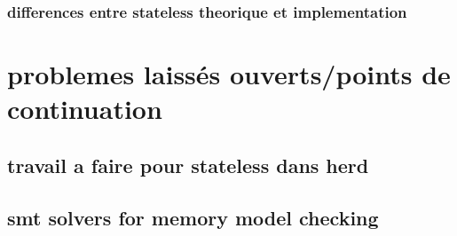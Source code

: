\documentclass[a4]{article}
\begin{document}
\subsubsection{differences entre stateless theorique et implementation}

\section{problemes laissés ouverts/points de continuation}

\subsection{travail a faire pour stateless dans herd}

\subsection{smt solvers for memory model checking}
\end{document}
